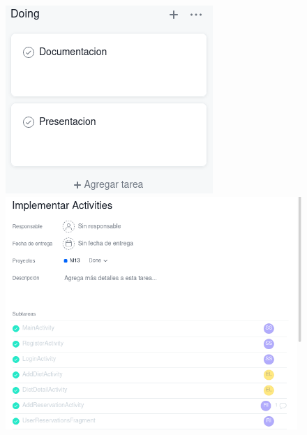 \documentclass[12pt,a4paper]{article}
\begin{document}
\begin{enumerate}
\begin{figure}[htb]
    \begin{minipage}[t]{.50\textwidth}
        \centering
        \includegraphics[width=\textwidth]{doing}
    \end{minipage}
    \hfill
    \begin{minipage}[t]{.50\textwidth}
        \centering
        \includegraphics[width=\textwidth]{subtask}
    \end{minipage}  
\end{figure}


\end{enumerate}
\end{document}
